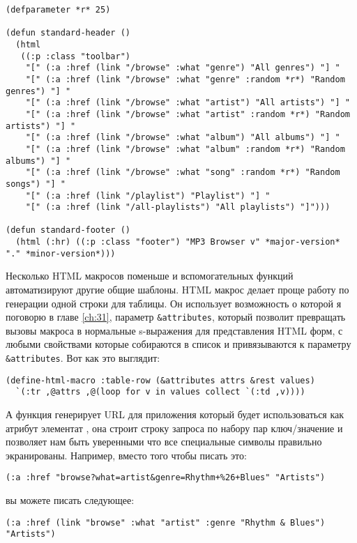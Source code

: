 \begin{lstlisting}
(defparameter *r* 25)

(defun standard-header ()
  (html
   ((:p :class "toolbar")
    "[" (:a :href (link "/browse" :what "genre") "All genres") "] "
    "[" (:a :href (link "/browse" :what "genre" :random *r*) "Random genres") "] "
    "[" (:a :href (link "/browse" :what "artist") "All artists") "] "
    "[" (:a :href (link "/browse" :what "artist" :random *r*) "Random artists") "] "
    "[" (:a :href (link "/browse" :what "album") "All albums") "] "
    "[" (:a :href (link "/browse" :what "album" :random *r*) "Random albums") "] "
    "[" (:a :href (link "/browse" :what "song" :random *r*) "Random songs") "] "
    "[" (:a :href (link "/playlist") "Playlist") "] "
    "[" (:a :href (link "/all-playlists") "All playlists") "]")))

(defun standard-footer ()
  (html (:hr) ((:p :class "footer") "MP3 Browser v" *major-version* "." *minor-version*)))
\end{lstlisting}

Несколько HTML макросов поменьше и вспомогательных функций автоматизируют другие общие
шаблоны. HTML макрос  делает проще работу по генерации одной строки для
таблицы. Он использует возможность  о которой я поговорю в главе \ref{ch:31},
параметр \lstinline!&attributes!, который позволит превращать вызовы макроса в нормальные
s-выражения для представления HTML форм, с любыми свойствами которые собираются в список и
привязываются к параметру \lstinline!&attributes!. Вот как это выглядит:

\begin{lstlisting}
(define-html-macro :table-row (&attributes attrs &rest values)
  `(:tr ,@attrs ,@(loop for v in values collect `(:td ,v))))
\end{lstlisting}

А функция  генерирует URL для приложения который будет использоваться как
атрибут  элементат , она строит строку запроса по набору пар
ключ/значение и позволяет нам быть уверенными что все специальные символы правильно
экранированы. Например, вместо того чтобы писать это:

\begin{lstlisting}
(:a :href "browse?what=artist&genre=Rhythm+%26+Blues" "Artists")
\end{lstlisting}

вы можете писать следующее:

\begin{lstlisting}
(:a :href (link "browse" :what "artist" :genre "Rhythm & Blues") "Artists")
\end{lstlisting}


